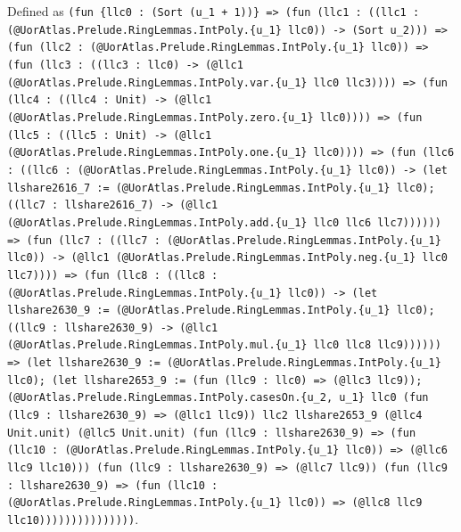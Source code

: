 \documentclass[11pt]{article}
\begin{document}
\noindent Defined as \texttt{(fun \{llc0 : (Sort (u\_1 + 1))\} => (fun (llc1 : ((llc1 : (@UorAtlas.Prelude.RingLemmas.IntPoly.\{u\_1\} llc0)) -> (Sort u\_2))) => (fun (llc2 : (@UorAtlas.Prelude.RingLemmas.IntPoly.\{u\_1\} llc0)) => (fun (llc3 : ((llc3 : llc0) -> (@llc1 (@UorAtlas.Prelude.RingLemmas.IntPoly.var.\{u\_1\} llc0 llc3)))) => (fun (llc4 : ((llc4 : Unit) -> (@llc1 (@UorAtlas.Prelude.RingLemmas.IntPoly.zero.\{u\_1\} llc0)))) => (fun (llc5 : ((llc5 : Unit) -> (@llc1 (@UorAtlas.Prelude.RingLemmas.IntPoly.one.\{u\_1\} llc0)))) => (fun (llc6 : ((llc6 : (@UorAtlas.Prelude.RingLemmas.IntPoly.\{u\_1\} llc0)) -> (let llshare2616\_7 := (@UorAtlas.Prelude.RingLemmas.IntPoly.\{u\_1\} llc0); ((llc7 : llshare2616\_7) -> (@llc1 (@UorAtlas.Prelude.RingLemmas.IntPoly.add.\{u\_1\} llc0 llc6 llc7)))))) => (fun (llc7 : ((llc7 : (@UorAtlas.Prelude.RingLemmas.IntPoly.\{u\_1\} llc0)) -> (@llc1 (@UorAtlas.Prelude.RingLemmas.IntPoly.neg.\{u\_1\} llc0 llc7)))) => (fun (llc8 : ((llc8 : (@UorAtlas.Prelude.RingLemmas.IntPoly.\{u\_1\} llc0)) -> (let llshare2630\_9 := (@UorAtlas.Prelude.RingLemmas.IntPoly.\{u\_1\} llc0); ((llc9 : llshare2630\_9) -> (@llc1 (@UorAtlas.Prelude.RingLemmas.IntPoly.mul.\{u\_1\} llc0 llc8 llc9)))))) => (let llshare2630\_9 := (@UorAtlas.Prelude.RingLemmas.IntPoly.\{u\_1\} llc0); (let llshare2653\_9 := (fun (llc9 : llc0) => (@llc3 llc9)); (@UorAtlas.Prelude.RingLemmas.IntPoly.casesOn.\{u\_2, u\_1\} llc0 (fun (llc9 : llshare2630\_9) => (@llc1 llc9)) llc2 llshare2653\_9 (@llc4 Unit.unit) (@llc5 Unit.unit) (fun (llc9 : llshare2630\_9) => (fun (llc10 : (@UorAtlas.Prelude.RingLemmas.IntPoly.\{u\_1\} llc0)) => (@llc6 llc9 llc10))) (fun (llc9 : llshare2630\_9) => (@llc7 llc9)) (fun (llc9 : llshare2630\_9) => (fun (llc10 : (@UorAtlas.Prelude.RingLemmas.IntPoly.\{u\_1\} llc0)) => (@llc8 llc9 llc10)))))))))))))))}.\par
\end{document}
